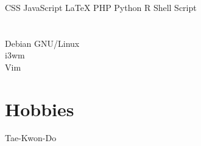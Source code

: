 \documentclass[]{friggeri-cv}
\begin{document}
\begin{aside}
~
~
~
  \section{}
    CSS
    JavaScript
    \LaTeX
    PHP
    Python
    R
    Shell Script
  ~
  \section{}
    Debian GNU/Linux \\%
    i3wm \\%
    Vim
  ~
  \section{Hobbies}
      \href{http://olhares.com/diraol}{}
      Tae-Kwon-Do
\end{aside}%
\end{document}
